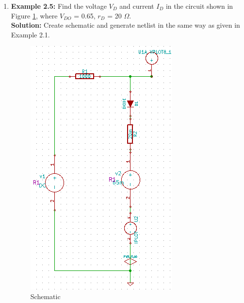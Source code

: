 \begin{enumerate}
\item \textbf {Example 2.5:} Find the voltage $V_D$ and current $I_D$ in the circuit shown in Figure \ref{apd11}, where $V_{DO}$ = 0.65, $r_D$ = 20 $\Omega$.\\

\textbf {Solution:} Create schematic and generate netlist in the same way as given in Example 2.1. 
\begin{figure}%
\begin{center}
\includegraphics[angle=90, width=1\linewidth]{figures/apd11.png}%
\caption{Schematic}
\label{apd11}
\end{center}
\end{figure}


\end{enumerate}
